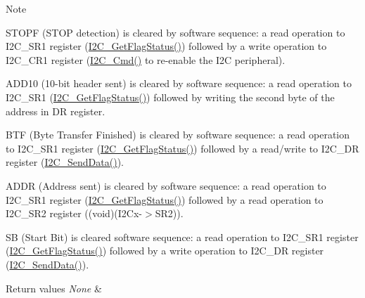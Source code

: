 \begin{DoxyNote}{Note}

\begin{DoxyItemize}
\item S\+T\+O\+PF (S\+T\+OP detection) is cleared by software sequence\+: a read operation to I2\+C\+\_\+\+S\+R1 register (\hyperlink{group___i2_c___private___functions_ga15c95d0ed124f029621a2061b1677ee7}{I2\+C\+\_\+\+Get\+Flag\+Status()}) followed by a write operation to I2\+C\+\_\+\+C\+R1 register (\hyperlink{group___i2_c___private___functions_ga7e1323c9133c2cb424dfb5b10b7d2f0b}{I2\+C\+\_\+\+Cmd()} to re-\/enable the I2C peripheral).
\item A\+D\+D10 (10-\/bit header sent) is cleared by software sequence\+: a read operation to I2\+C\+\_\+\+S\+R1 (\hyperlink{group___i2_c___private___functions_ga15c95d0ed124f029621a2061b1677ee7}{I2\+C\+\_\+\+Get\+Flag\+Status()}) followed by writing the second byte of the address in DR register.
\item B\+TF (Byte Transfer Finished) is cleared by software sequence\+: a read operation to I2\+C\+\_\+\+S\+R1 register (\hyperlink{group___i2_c___private___functions_ga15c95d0ed124f029621a2061b1677ee7}{I2\+C\+\_\+\+Get\+Flag\+Status()}) followed by a read/write to I2\+C\+\_\+\+DR register (\hyperlink{group___i2_c___private___functions_ga7bd9e70b8eafde0dd5eb42b0d95fe1a9}{I2\+C\+\_\+\+Send\+Data()}).
\item A\+D\+DR (Address sent) is cleared by software sequence\+: a read operation to I2\+C\+\_\+\+S\+R1 register (\hyperlink{group___i2_c___private___functions_ga15c95d0ed124f029621a2061b1677ee7}{I2\+C\+\_\+\+Get\+Flag\+Status()}) followed by a read operation to I2\+C\+\_\+\+S\+R2 register ((void)(I2\+Cx-\/$>$S\+R2)).
\item SB (Start Bit) is cleared software sequence\+: a read operation to I2\+C\+\_\+\+S\+R1 register (\hyperlink{group___i2_c___private___functions_ga15c95d0ed124f029621a2061b1677ee7}{I2\+C\+\_\+\+Get\+Flag\+Status()}) followed by a write operation to I2\+C\+\_\+\+DR register (\hyperlink{group___i2_c___private___functions_ga7bd9e70b8eafde0dd5eb42b0d95fe1a9}{I2\+C\+\_\+\+Send\+Data()}). 
\end{DoxyItemize}
\end{DoxyNote}

\begin{DoxyRetVals}{Return values}
{\em None} & \\
\hline
\end{DoxyRetVals}



